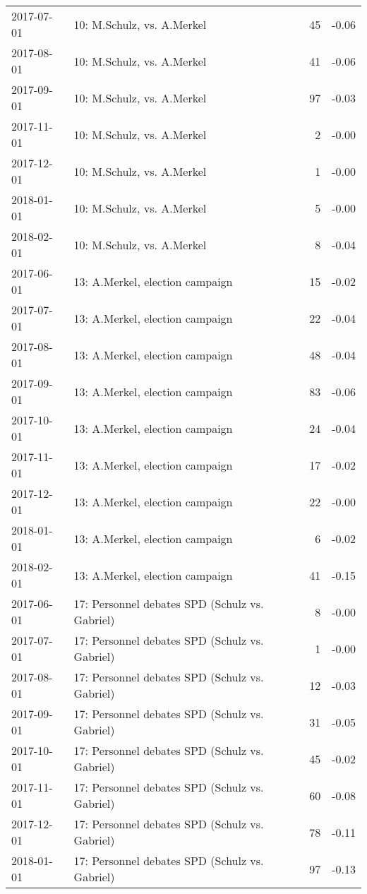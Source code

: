 \begin{table}[ht]
\begin{tabular}{llrr}
  2017-07-01 & 10: M.Schulz, vs. A.Merkel &  45 & -0.06 \\ 
  2017-08-01 & 10: M.Schulz, vs. A.Merkel &  41 & -0.06 \\ 
  2017-09-01 & 10: M.Schulz, vs. A.Merkel &  97 & -0.03 \\ 
  2017-11-01 & 10: M.Schulz, vs. A.Merkel &   2 & -0.00 \\ 
  2017-12-01 & 10: M.Schulz, vs. A.Merkel &   1 & -0.00 \\ 
  2018-01-01 & 10: M.Schulz, vs. A.Merkel &   5 & -0.00 \\ 
  2018-02-01 & 10: M.Schulz, vs. A.Merkel &   8 & -0.04 \\ 
  2017-06-01 & 13: A.Merkel, election campaign &  15 & -0.02 \\ 
  2017-07-01 & 13: A.Merkel, election campaign &  22 & -0.04 \\ 
  2017-08-01 & 13: A.Merkel, election campaign &  48 & -0.04 \\ 
  2017-09-01 & 13: A.Merkel, election campaign &  83 & -0.06 \\ 
  2017-10-01 & 13: A.Merkel, election campaign &  24 & -0.04 \\ 
  2017-11-01 & 13: A.Merkel, election campaign &  17 & -0.02 \\ 
  2017-12-01 & 13: A.Merkel, election campaign &  22 & -0.00 \\ 
  2018-01-01 & 13: A.Merkel, election campaign &   6 & -0.02 \\ 
  2018-02-01 & 13: A.Merkel, election campaign &  41 & -0.15 \\ 
  2017-06-01 & 17: Personnel debates SPD (Schulz vs. Gabriel) &   8 & -0.00 \\ 
  2017-07-01 & 17: Personnel debates SPD (Schulz vs. Gabriel) &   1 & -0.00 \\ 
  2017-08-01 & 17: Personnel debates SPD (Schulz vs. Gabriel) &  12 & -0.03 \\ 
  2017-09-01 & 17: Personnel debates SPD (Schulz vs. Gabriel) &  31 & -0.05 \\ 
  2017-10-01 & 17: Personnel debates SPD (Schulz vs. Gabriel) &  45 & -0.02 \\ 
  2017-11-01 & 17: Personnel debates SPD (Schulz vs. Gabriel) &  60 & -0.08 \\ 
  2017-12-01 & 17: Personnel debates SPD (Schulz vs. Gabriel) &  78 & -0.11 \\ 
  2018-01-01 & 17: Personnel debates SPD (Schulz vs. Gabriel) &  97 & -0.13 \\ 

\end{tabular}
\end{table}
